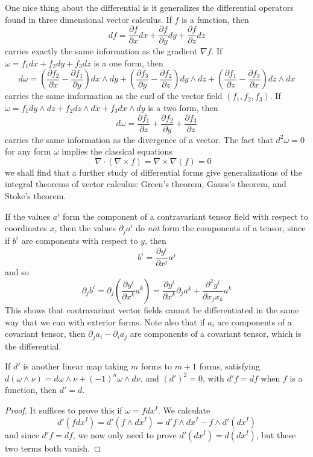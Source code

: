 \begin{example}
    One nice thing about the differential is it generalizes the differential operators found in three dimensional vector calculus. If $f$ is a function, then
    \[ df = \frac{\partial f}{\partial x} dx + \frac{\partial f}{\partial y} dy + \frac{\partial f}{\partial z} dz \]
    carries exactly the same information as the gradient $\nabla f$. If $\omega = f_1 dx + f_2 dy + f_3 dz$ is a one form, then
    \[ d\omega = \left( \frac{\partial f_2}{\partial x} - \frac{\partial f_1}{\partial y} \right) dx \wedge dy + \left( \frac{\partial f_3}{\partial y} - \frac{\partial f_2}{\partial z} \right) dy \wedge dz + \left( \frac{\partial f_1}{\partial z} - \frac{\partial f_3}{\partial x} \right) dz \wedge dx \]
    carries the same imformation as the curl of the vector field $(f_1,f_2,f_3)$. If $\omega = f_1 dy \wedge dz + f_2 dz \wedge dx + f_3 dx \wedge dy$ is a two form, then
    \[ d\omega = \frac{\partial f_1}{\partial z} + \frac{\partial f_2}{\partial y} + \frac{\partial f_3}{\partial z} \]
    carries the same information as the divergence of a vector. The fact that $d^2 \omega = 0$ for any form $\omega$ implies the classical equations
    \[ \nabla \cdot (\nabla \times f) = \nabla \times \nabla(f) = 0\ \ \ \  \]
    we shall find that a further study of differential forms give generalizations of the integral theorems of vector calculus: Green's theorem, Gauss's theorem, and Stoke's theorem.
\end{example}

\begin{example}
    If the values $a^i$ form the component of a contravariant tensor field with respect to coordinates $x$, then the values $\partial_j a^i$ do {\it not} form the components of a tensor, since if $b^i$ are components with respect to $y$, then
    \[ b^i = \frac{\partial y^i}{\partial x^j} a^j \]
    and so
    \[ \partial_j b^i = \partial_j \left( \frac{\partial y^i}{\partial x^k} a^k \right) = \frac{\partial y^i}{\partial x^k} \partial_j a^k + \frac{\partial^2 y^i}{\partial x_j x_k} a^k \]
    This shows that contravariant vector fields cannot be differentiated in the same way that we can with exterior forms. Note also that if $a_i$ are components of a covariant tensor, then $\partial_j a_i - \partial_i a_j$ are components of a covariant tensor, which is the differential.
\end{example}

\begin{theorem}
    If $d'$ is another linear map taking $m$ forms to $m+1$ forms, satisfying $d(\omega \wedge \nu) = d\omega \wedge \nu + (-1)^n \omega \wedge d\nu$, and $(d')^2 = 0$, with $d'f = df$ when $f$ is a function, then $d' = d$.
\end{theorem}
\begin{proof}
    It suffices to prove this if $\omega = f dx^I$. We calculate
    \[ d'(f dx^I) = d'(f \wedge dx^I) = d'f \wedge dx^I - f \wedge d'(dx^I) \]
    and since $d'f = df$, we now only need to prove $d'(dx^I) = d(dx^I)$, but these two terms both vanish.
\end{proof}

